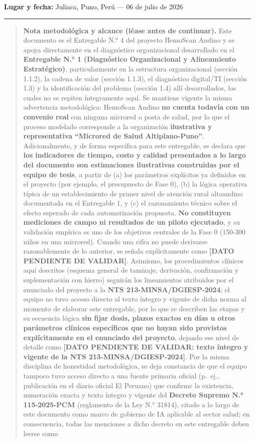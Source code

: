 \documentclass[11pt,a4paper]{article}
\begin{document}
\textbf{Lugar y fecha:} Juliaca, Puno, Perú --- 06 de julio de 2026

\begin{center}\rule{0.5\linewidth}{0.5pt}\end{center}

\begin{quote}
\textbf{Nota metodológica y alcance (léase antes de continuar).} Este documento es el Entregable N.° 4 del proyecto HemoScan Andino y se apoya directamente en el diagnóstico organizacional desarrollado en el \textbf{Entregable N.° 1 (Diagnóstico Organizacional y Alineamiento Estratégico)}, particularmente en la estructura organizacional (sección 1.1.2), la cadena de valor (sección 1.1.3), el diagnóstico digital/TI (sección 1.3) y la identificación del problema (sección 1.4) allí desarrollados, los cuales no se repiten íntegramente aquí. Se mantiene vigente la misma advertencia metodológica: HemoScan Andino \textbf{no cuenta todavía con un convenio real} con ninguna microred o posta de salud, por lo que el proceso modelado corresponde a la organización \textbf{ilustrativa y representativa ``Microred de Salud Altiplano-Puno''}. Adicionalmente, y de forma específica para este entregable, se declara que \textbf{los indicadores de tiempo, costo y calidad presentados a lo largo del documento son estimaciones ilustrativas construidas por el equipo de tesis}, a partir de (a) los parámetros explícitos ya definidos en el proyecto (por ejemplo, el presupuesto de Fase 0), (b) la lógica operativa típica de un establecimiento de primer nivel de atención rural altoandino documentada en el Entregable 1, y (c) el razonamiento técnico sobre el efecto esperado de cada automatización propuesta. \textbf{No constituyen mediciones de campo ni resultados de un piloto ejecutado}, y su validación empírica es uno de los objetivos centrales de la Fase 0 (150-300 niños en una microred). Cuando una cifra no puede derivarse razonablemente de lo anterior, se señala explícitamente como \textbf{{[}DATO PENDIENTE DE VALIDAR{]}}. Asimismo, los procedimientos clínicos aquí descritos (esquema general de tamizaje, derivación, confirmación y suplementación con hierro) seguirán los lineamientos atribuidos por el enunciado del proyecto a la \textbf{NTS 213-MINSA/DGIESP-2024}; el equipo no tuvo acceso directo al texto íntegro y vigente de dicha norma al momento de elaborar este entregable, por lo que se describen las etapas y su secuencia lógica \textbf{sin fijar dosis, plazos exactos en días u otros parámetros clínicos específicos que no hayan sido provistos explícitamente en el enunciado del proyecto}, dejando ese nivel de detalle como \textbf{{[}DATO PENDIENTE DE VALIDAR: texto íntegro y vigente de la NTS 213-MINSA/DGIESP-2024{]}}. Por la misma disciplina de honestidad metodológica, se deja constancia de que el equipo tampoco tuvo acceso directo a una fuente primaria oficial (p.~ej., publicación en el diario oficial El Peruano) que confirme la existencia, numeración exacta y texto íntegro y vigente del \textbf{Decreto Supremo N.° 115-2025-PCM} (reglamento de la Ley N.° 31814), citado a lo largo de este documento como marco de gobierno de IA aplicable al sector salud; en consecuencia, todas las menciones a dicho decreto en este entregable deben leerse como 
\end{quote}
\end{document}
